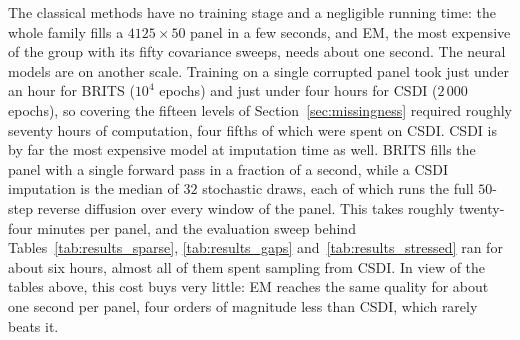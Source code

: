 The classical methods have no training stage and a negligible running
time: the whole family fills a $4125 \times 50$ panel in a few seconds,
and EM, the most expensive of the group with its fifty covariance sweeps,
needs about one second. The neural models are on another scale. Training
on a single corrupted panel took just under an hour for BRITS ($10^{4}$
epochs) and just under four hours for CSDI ($2\,000$ epochs), so covering
the fifteen levels of Section~\ref{sec:missingness} required roughly
seventy hours of computation, four fifths of which were spent on CSDI.
CSDI is by far the most expensive model at imputation time as well. BRITS
fills the panel with a single forward pass in a fraction of a second,
while a CSDI imputation is the median of $32$ stochastic draws, each of
which runs the full $50$-step reverse diffusion over every window of the
panel. This takes roughly twenty-four minutes per panel, and the
evaluation sweep behind Tables~\ref{tab:results_sparse},
\ref{tab:results_gaps} and~\ref{tab:results_stressed} ran for about six
hours, almost all of them spent sampling from CSDI. In view of the tables
above, this cost buys very little: EM reaches the same quality for about
one second per panel, four orders of magnitude less than CSDI, which
rarely beats it.

